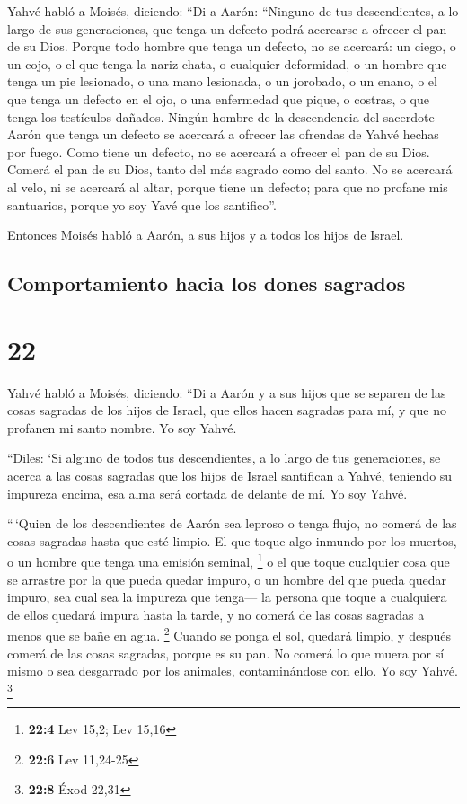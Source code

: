  Yahvé habló a Moisés, diciendo:  ``Di a
Aarón: ``Ninguno de tus descendientes, a lo largo de sus generaciones,
que tenga un defecto podrá acercarse a ofrecer el pan de su Dios.
 Porque todo hombre que tenga un defecto, no se acercará:
un ciego, o un cojo, o el que tenga la nariz chata, o cualquier
deformidad,  o un hombre que tenga un pie lesionado, o
una mano lesionada,  o un jorobado, o un enano, o el que
tenga un defecto en el ojo, o una enfermedad que pique, o costras, o que
tenga los testículos dañados.  Ningún hombre de la
descendencia del sacerdote Aarón que tenga un defecto se acercará a
ofrecer las ofrendas de Yahvé hechas por fuego. Como tiene un defecto,
no se acercará a ofrecer el pan de su Dios.  Comerá el
pan de su Dios, tanto del más sagrado como del santo.  No
se acercará al velo, ni se acercará al altar, porque tiene un defecto;
para que no profane mis santuarios, porque yo soy Yavé que los
santifico''.

 Entonces Moisés habló a Aarón, a sus hijos y a todos los
hijos de Israel.

\hypertarget{comportamiento-hacia-los-dones-sagrados}{%
\subsection{Comportamiento hacia los dones
sagrados}\label{comportamiento-hacia-los-dones-sagrados}}

\hypertarget{section-21}{%
\section{22}\label{section-21}}

 Yahvé habló a Moisés, diciendo:  ``Di a
Aarón y a sus hijos que se separen de las cosas sagradas de los hijos de
Israel, que ellos hacen sagradas para mí, y que no profanen mi santo
nombre. Yo soy Yahvé.

 ``Diles: `Si alguno de todos tus descendientes, a lo
largo de tus generaciones, se acerca a las cosas sagradas que los hijos
de Israel santifican a Yahvé, teniendo su impureza encima, esa alma será
cortada de delante de mí. Yo soy Yahvé.

 ``\,`Quien de los descendientes de Aarón sea leproso o
tenga flujo, no comerá de las cosas sagradas hasta que esté limpio. El
que toque algo inmundo por los muertos, o un hombre que tenga una
emisión seminal, \footnote{\textbf{22:4} Lev 15,2; Lev 15,16}
 o el que toque cualquier cosa que se arrastre por la que
pueda quedar impuro, o un hombre del que pueda quedar impuro, sea cual
sea la impureza que tenga---  la persona que toque a
cualquiera de ellos quedará impura hasta la tarde, y no comerá de las
cosas sagradas a menos que se bañe en agua. \footnote{\textbf{22:6} Lev
  11,24-25}  Cuando se ponga el sol, quedará limpio, y
después comerá de las cosas sagradas, porque es su pan. 
No comerá lo que muera por sí mismo o sea desgarrado por los animales,
contaminándose con ello. Yo soy Yahvé. \footnote{\textbf{22:8} Éxod
  22,31}

